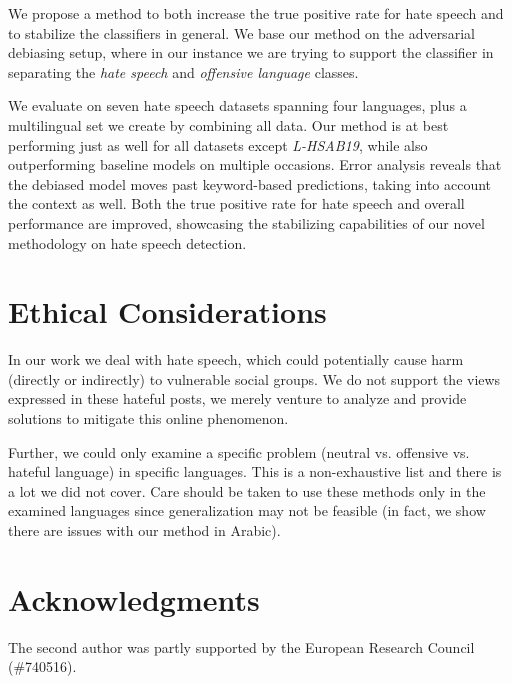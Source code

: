 \documentclass[11pt]{article}
\begin{document}
	We propose a method to both increase the true positive rate for hate speech and to stabilize the classifiers in general. We base our method on the adversarial debiasing setup, where in our instance we are trying to support the classifier in separating the \textit{hate speech} and \textit{offensive language} classes.
	
	We evaluate on seven hate speech datasets spanning four languages, plus a multilingual set we create by combining all data. Our method is at best performing just as well for all datasets except \textit{L-HSAB19}, while also outperforming baseline models on multiple occasions. Error analysis reveals that the debiased model moves past keyword-based predictions, taking into account the context as well. Both the true positive rate for hate speech and overall performance are improved, showcasing the stabilizing capabilities of our novel methodology on hate speech detection.
	
	\section{Ethical Considerations}
	
	In our work we deal with hate speech, which could potentially cause harm (directly or indirectly) to vulnerable social groups. We do not support the views expressed in these hateful posts, we merely venture to analyze and provide solutions to mitigate this online phenomenon.
	
	Further, we could only examine a specific problem (neutral vs. offensive vs. hateful language) in specific languages. This is a non-exhaustive list and there is a lot we did not cover. Care should be taken to use these methods only in the examined languages since generalization may not be feasible (in fact, we show there are issues with our method in Arabic).
	
	\section{Acknowledgments}
	
	The second author was partly supported by the European Research Council (\#740516).
	
	
	
	
	
	
	
	
	
	\appendix
	
	
	
\end{document}
